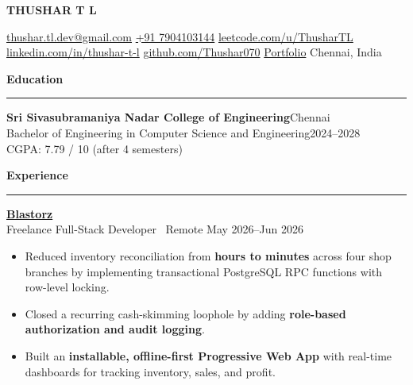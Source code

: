 \documentclass[10pt,a4paper]{article}
\newcommand{\sectionheading}[1]{%
  \par\vspace{3pt}%
  \textbf{\large #1}\\[-8pt]
  \hrule
  \vspace{3pt}%
}
\begin{document}

\begin{center}
{\LARGE \textbf{THUSHAR T L}}
\end{center}

\vspace{-0.8em}

\begin{center}
\href{mailto:thushar.tl.dev@gmail.com}{thushar.tl.dev@gmail.com}
\quad\textbf{\textbar}\quad
\href{tel:+917904103144}{+91 7904103144}
\quad\textbf{\textbar}\quad
\href{https://leetcode.com/u/ThusharTL/}{leetcode.com/u/ThusharTL}
\quad\textbf{\textbar}\quad
\href{https://www.linkedin.com/in/thushar-t-l-345845377/}{linkedin.com/in/thushar-t-l}
\quad\textbf{\textbar}\quad
\href{https://github.com/Thushar070}{github.com/Thushar070}
\quad\textbf{\textbar}\quad
\href{https://thushar-portfolio.vercel.app/}{Portfolio}
\quad\textbf{\textbar}\quad
Chennai, India
\end{center}


\sectionheading{Education}

\textbf{Sri Sivasubramaniya Nadar College of Engineering}\hfill Chennai\\
Bachelor of Engineering in Computer Science and Engineering\hfill 2024--2028\\
CGPA: 7.79 / 10 (after 4 semesters)



\sectionheading{Experience}

\textbf{\href{https://www.blastorz.fun/}{Blastorz}}\\
Freelance Full-Stack Developer \textbar\ Remote
\hfill May 2026--Jun 2026

\begin{itemize}
\item Reduced inventory reconciliation from \textbf{hours to minutes} across four shop branches by implementing transactional PostgreSQL RPC functions with row-level locking.
\item Closed a recurring cash-skimming loophole by adding \textbf{role-based authorization and audit logging}.
\item Built an \textbf{installable, offline-first Progressive Web App} with real-time dashboards for tracking inventory, sales, and profit.
\end{itemize}

\vspace{4pt}
\end{document}
